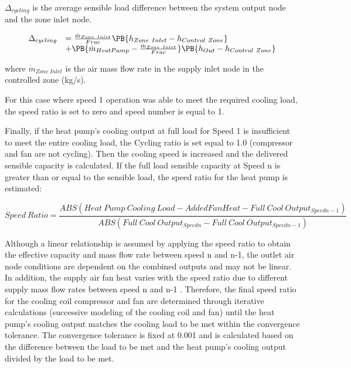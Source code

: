 \(\Delta_{cycling}\) is the average sensible load difference between the system output node and the zone inlet node.

\begin{equation}
  \begin{array}{rl}
    \Delta_{cycling} &= \frac{\dot{m}_{Zone~Inlet}}{Frac} \PB{h_{Zone~Inlet}-h_{Control~Zone}} \\
                           &+ \PB{\dot{m}_{HeatPump} - \frac{\dot{m}_{Zone~Inlet}}{Frac}} \PB{h_{Out} - h_{Control~Zone}}
  \end{array}
\end{equation}

where \({{{\dot m}_{Zone~Inlet}}}\) is the air mass flow rate in the supply inlet node in the controlled zone (kg/s).

For this case where speed 1 operation was able to meet the required cooling load, the speed ratio is set to zero and speed number is equal to 1.

Finally, if the heat pump's cooling output at full load for Speed 1 is insufficient to meet the entire cooling load, the Cycling ratio is set equal to 1.0 (compressor and fan are not cycling). Then the cooling speed is increased and the delivered sensible capacity is calculated. If the full load sensible capacity at Speed n is greater than or equal to the sensible load, the speed ratio for the heat pump is estimated:

\begin{equation}
Speed~Ratio = \frac{{ABS(Heat~Pump~Cooling~Load - AddedFanHeat - Full~Cool~ Outpu{t_{Speedn-1}})}}{{ABS(Full~Cool~Outpu{t_{Speedn}} - Full~Cool~Outpu{t_{Speedn-1}})}} 
\end{equation}

Although a linear relationship is assumed by applying the speed ratio to obtain the effective capacity and mass flow rate between speed n and n-1, the outlet air node conditions are dependent on the combined outputs and may not be linear. In addition, the supply air fan heat varies with the speed ratio due to different supply mass flow rates between speed n and n-1 . Therefore, the final speed ratio for the cooling coil compressor and fan are determined through iterative calculations (successive modeling of the cooling coil and fan) until the heat pump's cooling output matches the cooling load to be met within the convergence tolerance. The convergence tolerance is fixed at 0.001 and is calculated based on the difference between the load to be met and the heat pump's cooling output divided by the load to be met.

